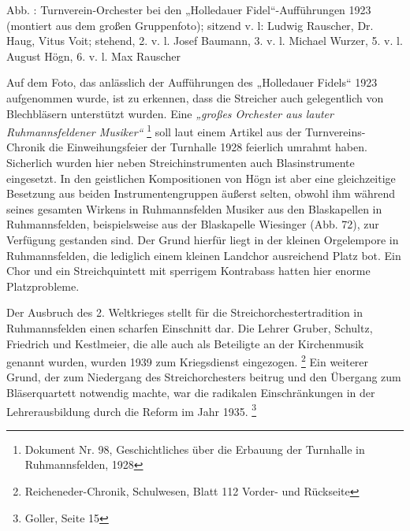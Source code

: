 \documentclass[a4paper]{article}
\newcommand\textstyleZitate[1]{\textit{#1}}
\newcounter{Abb}
\renewcommand\theAbb{\arabic{Abb}}
\begin{document}
Abb. \stepcounter{Abb}{\theAbb}: Turnverein-Orchester bei den
„Holledauer Fidel“-Aufführungen 1923 (montiert aus dem großen
Gruppenfoto); sitzend v. l: Ludwig Rauscher, Dr. Haug, Vitus Voit;
stehend, 2. v. l. Josef Baumann, 3. v. l. Michael Wurzer, 5. v. l.
August Högn, 6. v. l. Max Rauscher

Auf dem Foto, das anlässlich der Aufführungen des „Holledauer Fidels“
1923 aufgenommen wurde, ist zu erkennen, dass die Streicher auch
gelegentlich von Blechbläsern unterstützt wurden. Eine
\textstyleZitate{„großes Orchester aus lauter Ruhmannsfeldener
Musiker“}  \footnote{Dokument Nr. 98, Geschichtliches über die Erbauung
der Turnhalle in Ruhmannsfelden, 1928} soll laut einem Artikel aus der
Turnvereins-Chronik die Einweihungsfeier der Turnhalle 1928 feierlich
umrahmt haben. Sicherlich wurden hier neben Streichinstrumenten auch
Blasinstrumente eingesetzt. In den geistlichen Kompositionen von Högn
ist aber eine gleichzeitige Besetzung aus beiden Instrumentengruppen
äußerst selten, obwohl ihm während seines gesamten Wirkens in
Ruhmannsfelden Musiker aus den Blaskapellen in Ruhmannsfelden,
beispielsweise aus der Blaskapelle Wiesinger (Abb. 72), zur Verfügung
gestanden sind. Der Grund hierfür liegt in der kleinen Orgelempore in
Ruhmannsfelden, die lediglich einem kleinen Landchor ausreichend Platz
bot. Ein Chor und ein Streichquintett mit sperrigem Kontrabass hatten
hier enorme Platzprobleme.

Der Ausbruch des 2. Weltkrieges stellt für die Streichorchestertradition
in Ruhmannsfelden einen scharfen Einschnitt dar. Die Lehrer Gruber,
Schultz, Friedrich und Kestlmeier, die alle auch als Beteiligte an der
Kirchenmusik genannt wurden, wurden 1939 zum Kriegsdienst
eingezogen. \footnote{Reicheneder-Chronik, Schulwesen, Blatt 112
Vorder- und Rückseite} Ein weiterer Grund, der zum Niedergang des
Streichorchesters beitrug und den Übergang zum Bläserquartett notwendig
machte, war die radikalen Einschränkungen in der Lehrerausbildung durch
die Reform im Jahr 1935. \footnote{Goller, Seite 15}
\end{document}
